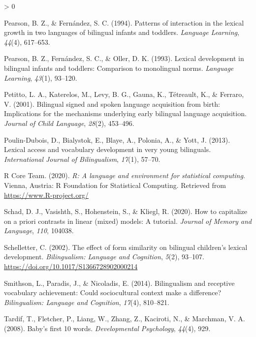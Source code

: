 \documentclass[
  english,
  man,man,floatsintext]{apa6}
\newlength{\cslhangindent}
\newenvironment{CSLReferences}[2] %
 {%
  \setlength{\parindent}{0pt}
  \ifodd #1 \everypar{\setlength{\hangindent}{\cslhangindent}}\ignorespaces\fi
  \ifnum #2 > 0
  \setlength{\parskip}{#2\baselineskip}
  \fi
 }%
 {}
\begin{document}
\begin{CSLReferences}{1}{0}
\leavevmode\hypertarget{ref-pearson1994patterns}{}%
Pearson, B. Z., \& Fernández, S. C. (1994). Patterns of interaction in the lexical growth in two languages of bilingual infants and toddlers. \emph{Language Learning}, \emph{44}(4), 617--653.

\leavevmode\hypertarget{ref-pearson1993lexical}{}%
Pearson, B. Z., Fernández, S. C., \& Oller, D. K. (1993). Lexical development in bilingual infants and toddlers: Comparison to monolingual norms. \emph{Language Learning}, \emph{43}(1), 93--120.

\leavevmode\hypertarget{ref-petitto2001bilingual}{}%
Petitto, L. A., Katerelos, M., Levy, B. G., Gauna, K., Tétreault, K., \& Ferraro, V. (2001). Bilingual signed and spoken language acquisition from birth: Implications for the mechanisms underlying early bilingual language acquisition. \emph{Journal of Child Language}, \emph{28}(2), 453--496.

\leavevmode\hypertarget{ref-poulin2013lexical}{}%
Poulin-Dubois, D., Bialystok, E., Blaye, A., Polonia, A., \& Yott, J. (2013). Lexical access and vocabulary development in very young bilinguals. \emph{International Journal of Bilingualism}, \emph{17}(1), 57--70.

\leavevmode\hypertarget{ref-R-base}{}%
R Core Team. (2020). \emph{R: A language and environment for statistical computing}. Vienna, Austria: R Foundation for Statistical Computing. Retrieved from \url{https://www.R-project.org/}

\leavevmode\hypertarget{ref-schad2020capitalize}{}%
Schad, D. J., Vasishth, S., Hohenstein, S., \& Kliegl, R. (2020). How to capitalize on a priori contrasts in linear (mixed) models: A tutorial. \emph{Journal of Memory and Language}, \emph{110}, 104038.

\leavevmode\hypertarget{ref-schelletter2002effect}{}%
Schelletter, C. (2002). The effect of form similarity on bilingual children's lexical development. \emph{Bilingualism: Language and Cognition}, \emph{5}(2), 93--107. \url{https://doi.org/10.1017/S1366728902000214}

\leavevmode\hypertarget{ref-smithson2014bilingualism}{}%
Smithson, L., Paradis, J., \& Nicoladis, E. (2014). Bilingualism and receptive vocabulary achievement: Could sociocultural context make a difference? \emph{Bilingualism: Language and Cognition}, \emph{17}(4), 810--821.

\leavevmode\hypertarget{ref-tardif2008baby}{}%
Tardif, T., Fletcher, P., Liang, W., Zhang, Z., Kaciroti, N., \& Marchman, V. A. (2008). Baby's first 10 words. \emph{Developmental Psychology}, \emph{44}(4), 929.


\end{CSLReferences}
\end{document}
